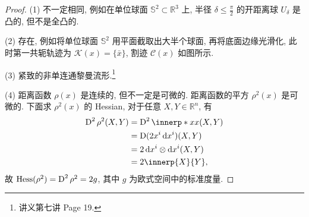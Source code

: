 \begin{proof}
  \renewcommand{\proofname}{解}
  (1) 不一定相同, 例如在单位球面 $\mathbb{S}^2\subset\mathbb{R}^3$ 上,
  半径 $\delta\leq\frac{\pi}{2}$ 的开距离球 $U_{\delta}$ 是凸的,
  但不是全凸的.

  (2) 存在, 例如将单位球面 $\mathbb{S}^2$ 用平面截取出大半个球面, 再将底面边缘光滑化,
  此时第一共轭轨迹为 $\mathscr{K}(x)=\{\bar{x}\}$,
  割迹 $\mathscr{C}(x)$ 如图所示.

  (3) 紧致的非单连通黎曼流形.\footnote{讲义第七讲 Page 19.}

  (4) 距离函数 $\rho(x)$ 是连续的, 但不一定是可微的. 
  距离函数的平方 $\rho^2(x)$ 是可微的. 下面求 $\rho^2(x)$ 的 Hessian,
  对于任意 $X,Y\in\mathbb{R}^n$, 有
  \begin{align*}
    \D^2\rho^2(X,Y)
    & = \D^2\innerp*{x}{x}(X,Y) \\
    & = \D(2x^i\diff x^i)(X,Y) \\
    & = 2\diff x^i\otimes\diff x^i(X,Y) \\
    & = 2\innerp{X}{Y},
  \end{align*}
  故 $\operatorname{Hess}(\rho^2)=\operatorname{D}^2\rho^2=2g$, 其中 $g$ 为欧式空间中的标准度量.
\end{proof}